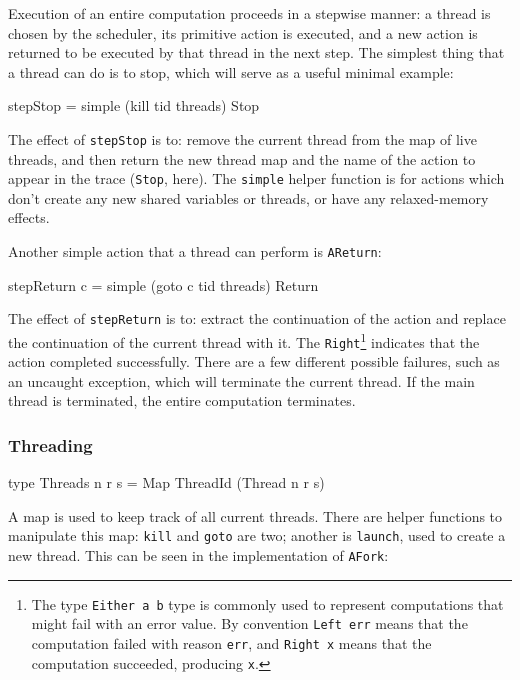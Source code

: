 Execution of an entire computation proceeds in a stepwise manner: a
thread is chosen by the scheduler, its primitive action is executed,
and a new action is returned to be executed by that thread in the next
step. The simplest thing that a thread can do is to stop, which will
serve as a useful minimal example:

\begin{haskellcode}
stepStop = simple (kill tid threads) Stop
\end{haskellcode}

The effect of \verb|stepStop| is to: remove the current thread from
the map of live threads, and then return the new thread map and the
name of the action to appear in the trace (\verb|Stop|, here). The
\verb|simple| helper function is for actions which don't create any
new shared variables or threads, or have any relaxed-memory effects.

Another simple action that a thread can perform is \verb|AReturn|:

\begin{haskellcode}
stepReturn c = simple (goto c tid threads) Return
\end{haskellcode}

The effect of \verb|stepReturn| is to: extract the continuation of the
action and replace the continuation of the current thread with it. The
\verb|Right|\footnote{The type \texttt{Either a b} type is commonly
  used to represent computations that might fail with an error
  value. By convention \texttt{Left err} means that the computation
  failed with reason \texttt{err}, and \texttt{Right x} means that the
  computation succeeded, producing \texttt{x}.}  indicates that the
action completed successfully. There are a few different possible
failures, such as an uncaught exception, which will terminate the
current thread. If the main thread is terminated, the entire
computation terminates.

\subsubsection{Threading}
\label{sec:execution-stepwise-threading}

\begin{haskellcode}
type Threads n r s = Map ThreadId (Thread n r s)
\end{haskellcode}

A map is used to keep track of all current threads. There are helper
functions to manipulate this map: \verb|kill| and \verb|goto| are two;
another is \verb|launch|, used to create a new thread. This can be
seen in the implementation of \verb|AFork|:

